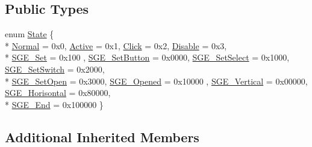 \subsection*{Public Types}
\begin{DoxyCompactItemize}
\item 
enum \hyperlink{classcsad_1_1_s_g_base_element_ab936ff0f0f69ecf8b67d60e53ae30cd0}{State} \{ \\*
\hyperlink{classcsad_1_1_s_g_base_element_ab936ff0f0f69ecf8b67d60e53ae30cd0a92de2f632ce50553c439ccf7be7fb49c}{Normal} = 0x0, 
\hyperlink{classcsad_1_1_s_g_base_element_ab936ff0f0f69ecf8b67d60e53ae30cd0a4f85b7110ba36e6528e4525940bbaa30}{Active} = 0x1, 
\hyperlink{classcsad_1_1_s_g_base_element_ab936ff0f0f69ecf8b67d60e53ae30cd0af0f2e90a5c21acc8ecd2bd39f7f171cd}{Click} = 0x2, 
\hyperlink{classcsad_1_1_s_g_base_element_ab936ff0f0f69ecf8b67d60e53ae30cd0aa2fd3cf9e226675e04ac4f29d20dd9ca}{Disable} = 0x3, 
\\*
\hyperlink{classcsad_1_1_s_g_base_element_ab936ff0f0f69ecf8b67d60e53ae30cd0ac561cea7ffdb2ae25058cb24ac7c0880}{S\-G\-E\-\_\-\-Set} = 0x100
, \hyperlink{classcsad_1_1_s_g_base_element_ab936ff0f0f69ecf8b67d60e53ae30cd0a79b2a0773a4086055a45a40d48023698}{S\-G\-E\-\_\-\-Set\-Button} = 0x0000, 
\hyperlink{classcsad_1_1_s_g_base_element_ab936ff0f0f69ecf8b67d60e53ae30cd0a89cdb6212cdf0cfe4a704ff136ca2630}{S\-G\-E\-\_\-\-Set\-Select} = 0x1000, 
\hyperlink{classcsad_1_1_s_g_base_element_ab936ff0f0f69ecf8b67d60e53ae30cd0afa0d9a05aa79ae656a43b7398e928604}{S\-G\-E\-\_\-\-Set\-Switch} = 0x2000, 
\\*
\hyperlink{classcsad_1_1_s_g_base_element_ab936ff0f0f69ecf8b67d60e53ae30cd0a6f0bf457081d2bd938f3ba2ed164d42d}{S\-G\-E\-\_\-\-Set\-Open} = 0x3000, 
\hyperlink{classcsad_1_1_s_g_base_element_ab936ff0f0f69ecf8b67d60e53ae30cd0a89e7d86b338fdc3a88a1fe7f94481766}{S\-G\-E\-\_\-\-Opened} = 0x10000
, \hyperlink{classcsad_1_1_s_g_base_element_ab936ff0f0f69ecf8b67d60e53ae30cd0a202751683618959b30a6f50cbbe15b7a}{S\-G\-E\-\_\-\-Vertical} = 0x00000, 
\hyperlink{classcsad_1_1_s_g_base_element_ab936ff0f0f69ecf8b67d60e53ae30cd0a8a69f16afd37f363140bde77ea1de227}{S\-G\-E\-\_\-\-Horisontal} = 0x80000, 
\\*
\hyperlink{classcsad_1_1_s_g_base_element_ab936ff0f0f69ecf8b67d60e53ae30cd0afcbf1e4a77948d4fae4a5ba5e2d751b3}{S\-G\-E\-\_\-\-End} = 0x100000
 \}
\end{DoxyCompactItemize}
\subsection*{Additional Inherited Members}


